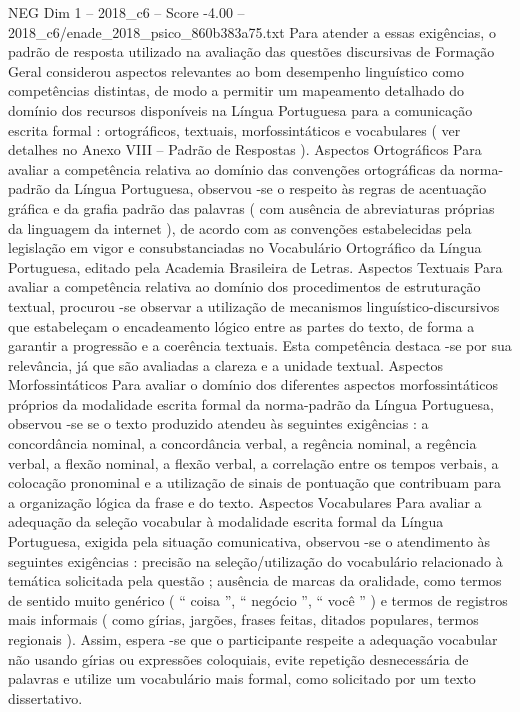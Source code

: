 \begin{textsample}{NEG Dim 1 – 2018\_c6 – Score -4.00 – 2018\_c6/enade\_2018\_psico\_860b383a75.txt}
Para atender a essas exigências, o padrão de resposta utilizado na avaliação das questões discursivas de Formação Geral considerou aspectos relevantes ao bom desempenho linguístico como competências distintas, de modo a permitir um mapeamento detalhado do domínio dos recursos disponíveis na Língua Portuguesa para a comunicação escrita formal : ortográficos, textuais, morfossintáticos e vocabulares ( ver detalhes no Anexo VIII – Padrão de Respostas ).
Aspectos Ortográficos Para avaliar a competência relativa ao domínio das convenções ortográficas da norma-padrão da Língua Portuguesa, observou -se o respeito às regras de acentuação gráfica e da grafia padrão das palavras ( com ausência de abreviaturas próprias da linguagem da internet ), de acordo com as convenções estabelecidas pela legislação em vigor e consubstanciadas no Vocabulário Ortográfico da Língua Portuguesa, editado pela Academia Brasileira de Letras.
Aspectos Textuais Para avaliar a competência relativa ao domínio dos procedimentos de estruturação textual, procurou -se observar a utilização de mecanismos linguístico-discursivos que estabeleçam o encadeamento lógico entre as partes do texto, de forma a garantir a progressão e a coerência textuais.
Esta competência destaca -se por sua relevância, já que são avaliadas a clareza e a unidade textual.
Aspectos Morfossintáticos Para avaliar o domínio dos diferentes aspectos morfossintáticos próprios da modalidade escrita formal da norma-padrão da Língua Portuguesa, observou -se se o texto produzido atendeu às seguintes exigências : a concordância nominal, a concordância verbal, a regência nominal, a regência verbal, a flexão nominal, a flexão verbal, a correlação entre os tempos verbais, a colocação pronominal e a utilização de sinais de pontuação que contribuam para a organização lógica da frase e do texto.
Aspectos Vocabulares Para avaliar a adequação da seleção vocabular à modalidade escrita formal da Língua Portuguesa, exigida pela situação comunicativa, observou -se o atendimento às seguintes exigências : precisão na seleção/utilização do vocabulário relacionado à temática solicitada pela questão ; ausência de marcas da oralidade, como termos de sentido muito genérico ( “ coisa ”, “ negócio ”, “ você ” ) e termos de registros mais informais ( como gírias, jargões, frases feitas, ditados populares, termos regionais ).
Assim, espera -se que o participante respeite a adequação vocabular não usando gírias ou expressões coloquiais, evite repetição desnecessária de palavras e utilize um vocabulário mais formal, como solicitado por um texto dissertativo.

\end{textsample}
